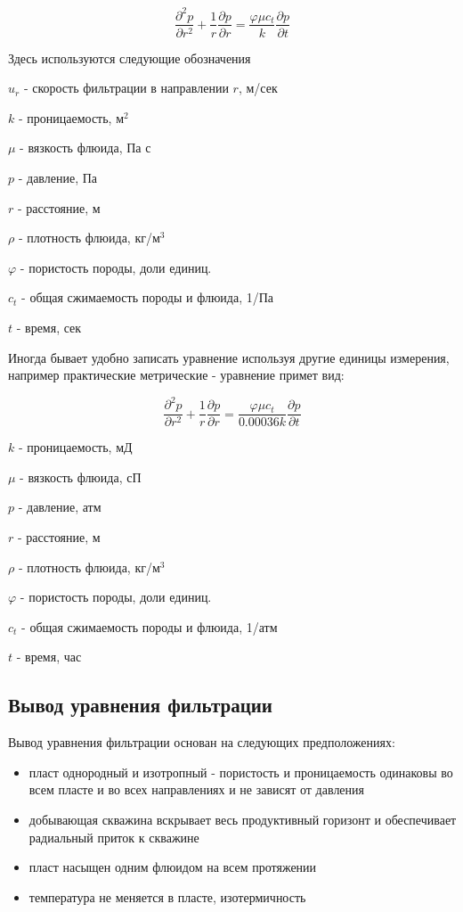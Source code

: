 \begin{equation} \label{eq:diff_eq_1} 
	\frac{\partial ^2 p }{\partial r^2} + \frac{1}{r} \frac{\partial p}{\partial r} = \frac{\varphi \mu c_t}{k} \frac{\partial p}{\partial t} 
\end{equation}

Здесь используются следующие обозначения

$u_r$ - скорость фильтрации в направлении $r$, м/сек

$k$ - проницаемость, м$^2$

$\mu$ - вязкость флюида, Па с

$p$ - давление, Па 

$r$ - расстояние, м 

$\rho$ - плотность флюида, кг/м$^3$

$\varphi$ - пористость породы, доли единиц.

$c_t$ - общая сжимаемость породы и флюида, 1/Па

$t$ - время, сек

Иногда бывает удобно записать уравнение используя другие единицы измерения, например практические метрические - уравнение примет вид:

\begin{equation} \label{eq:diff_eq_2} 
	\frac{\partial ^2 p }{\partial r^2} + \frac{1}{r} \frac{\partial p}{\partial r} = \frac{\varphi \mu c_t}{0.00036 k} \frac{\partial p}{\partial t} 
\end{equation}


$k$ - проницаемость, мД

$\mu$ - вязкость флюида, сП

$p$ - давление, атм 

$r$ - расстояние, м 

$\rho$ - плотность флюида, кг/м$^3$

$\varphi$ - пористость породы, доли единиц.

$c_t$ - общая сжимаемость породы и флюида, 1/атм

$t$ - время, час

\subsection{Вывод уравнения фильтрации}

Вывод уравнения фильтрации основан на следующих предположениях: 
\begin{itemize}
	\item пласт однородный и изотропный - пористость и проницаемость одинаковы во всем пласте и во всех направлениях и не зависят от давления 
	\item добывающая скважина вскрывает весь продуктивный горизонт и обеспечивает радиальный приток к скважине
	\item пласт насыщен одним флюидом на всем протяжении
	\item температура не меняется в пласте, изотермичность
\end{itemize}


